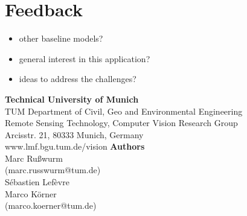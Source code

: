 \documentclass[a0]{tumposter}
\begin{document}
\begin{minipage}[t]{0.32\textwidth}
\begin{minipage}{\textwidth}
	 \end{minipage}
	 
	 \section{Feedback}
	 
	 \begin{itemize}
	 	\item other baseline models?
	 	\item general interest in this application?
	 	\item ideas to address the challenges?
	 \end{itemize}

	\tiny
	
	

\end{minipage}


\begin{footer}
	\begin{multicols}{2}
		\textbf{Technical University of Munich}\\
		TUM Department of Civil, Geo and Environmental Engineering \\
		Remote Sensing Technology, Computer Vision Research Group \\
		Arcisstr. 21, 80333 Munich, Germany \\
		www.lmf.bgu.tum.de/vision
	\vfill\columnbreak
		\textbf{Authors} \\
		Marc Rußwurm \\ (marc.russwurm@tum.de) \\
		Sébastien Lefèvre \\
		Marco Körner \\ (marco.koerner@tum.de)
	\vfill
	\end{multicols}
\end{footer}
\end{document}
